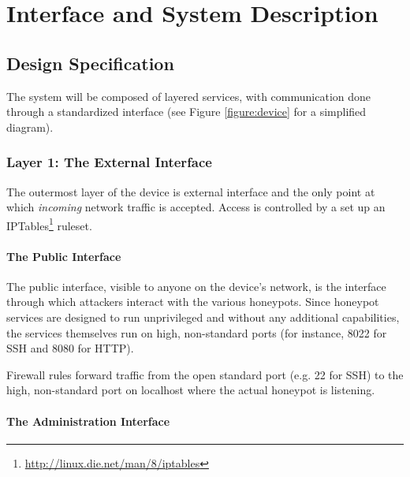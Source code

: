 \chapter{Interface and System Description}

\section{Design Specification}

The system will be composed of layered services, with communication done
through a standardized interface (see Figure \ref{figure:device} for a
simplified diagram).
\subsection{Layer 1: The External Interface}

The outermost layer of the device is external interface and the only point at
which \textit{incoming} network traffic is accepted. Access is controlled
by a set up an IPTables\footnote{\url{http://linux.die.net/man/8/iptables}}
ruleset.

\subsubsection{The Public Interface}

The public interface, visible to anyone on the device's network, is the
interface through which attackers interact with the various honeypots. Since
honeypot services are designed to run unprivileged and without any additional
capabilities, the services themselves run on high, non-standard
ports (for instance, 8022 for SSH and 8080 for HTTP).

Firewall rules forward traffic from the open standard port (e.g. 22 for SSH)
to the high, non-standard port on localhost where the actual honeypot
is listening.
\subsubsection{The Administration Interface}

